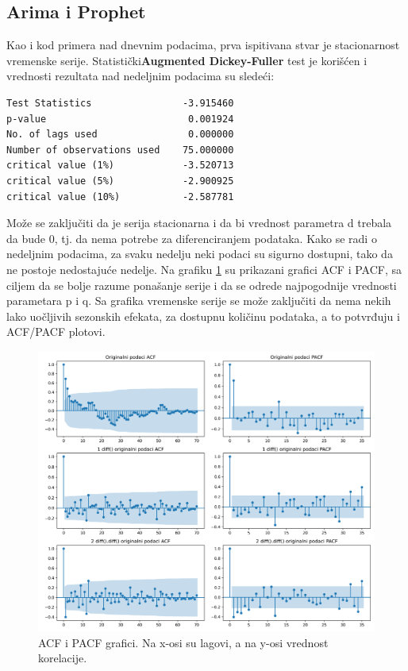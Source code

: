 \documentclass[12pt,oneside]{memoir}
\begin{document}
\subsection{Arima i Prophet}
Kao i kod primera nad dnevnim podacima, prva ispitivana stvar je stacionarnost vremenske serije. Statistički\textbf{Augmented Dickey-Fuller} test je korišćen i vrednosti rezultata nad nedeljnim podacima su sledeći:
\begin{verbatim}
Test Statistics                -3.915460
p-value                         0.001924
No. of lags used                0.000000
Number of observations used    75.000000
critical value (1%)            -3.520713
critical value (5%)            -2.900925
critical value (10%)           -2.587781
\end{verbatim}
    Može se zaključiti da je serija stacionarna i da bi vrednost parametra d trebala da bude 0, tj. da nema potrebe za diferenciranjem podataka. Kako se radi o nedeljnim podacima, za svaku nedelju neki podaci su sigurno dostupni, tako da ne postoje nedostajuće nedelje. Na grafiku \ref{fig: acf_pacf_nedeljni} su prikazani grafici ACF i PACF, sa ciljem da se bolje razume ponašanje serije i da se odrede najpogodnije vrednosti parametara p i q. Sa grafika vremenske serije se može zaključiti da nema nekih lako uočljivih sezonskih efekata, za dostupnu količinu podataka, a to potvrđuju i ACF/PACF plotovi. 
\begin{figure}[!ht]
  \centering
  \includegraphics[width=1\textwidth]{./grafici/acf_pacf_nedeljni.png}
  \caption{ACF i PACF grafici. Na x-osi su lagovi, a na y-osi vrednost korelacije.}
  \label{fig: acf_pacf_nedeljni}
\end{figure}
\end{document}
